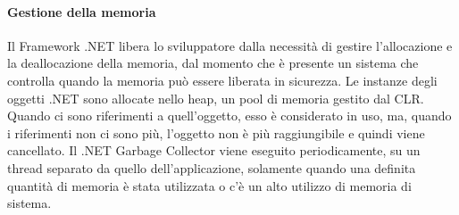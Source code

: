 \paragraph{Gestione della memoria}
Il Framework .NET libera lo sviluppatore dalla necessità di gestire l'allocazione e la deallocazione della memoria, dal momento che è presente un sistema che controlla quando la memoria può essere liberata in sicurezza. Le instanze degli oggetti .NET sono allocate nello heap, un pool di memoria gestito dal CLR. Quando ci sono riferimenti a quell'oggetto, esso è considerato in uso, ma, quando i riferimenti non ci sono più, l'oggetto non è più raggiungibile e quindi viene cancellato.
Il .NET Garbage Collector viene eseguito periodicamente, su un thread separato da quello dell'applicazione, solamente quando una definita quantità di memoria è stata utilizzata o c'è un alto utilizzo di memoria di sistema.




